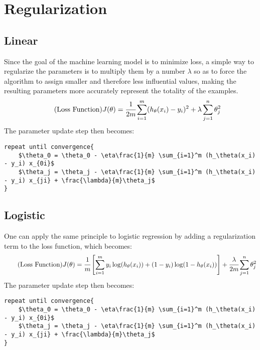 \section{Regularization}

\subsection{Linear}
Since the goal of the machine learning model is to minimize loss, a simple way to regularize the parameters is to multiply them by a number $\lambda$ so as to force the algorithm to assign smaller and therefore less influential values, making the resulting parameters more accurately represent the totality of the examples.
\begin{equation} \tag{Loss Function}
    J(\theta) = \cfrac{1}{2m} \sum_{i=1}^m (h_\theta(x_i) - y_i)^2 + \lambda \sum_{j=1}^n \theta_j^2
\end{equation}
The parameter update step then becomes:
\begin{lstlisting}[mathescape=true]
repeat until convergence{
    $\theta_0 = \theta_0 - \eta\frac{1}{m} \sum_{i=1}^m (h_\theta(x_i) - y_i) x_{0i}$
    $\theta_j = \theta_j - \eta\frac{1}{m} \sum_{i=1}^m (h_\theta(x_i) - y_i) x_{ji} + \frac{\lambda}{m}\theta_j$
}
\end{lstlisting}

\subsection{Logistic}
One can apply the same principle to logistic regression by adding a regularization term to the loss function, which becomes:
\begin{equation} \tag{Loss Function}
    J(\theta) = \cfrac{1}{m} \left[ \sum_{i=1}^m y_i \log(h_\theta(x_i)) + (1-y_i) \log(1-h_\theta(x_i)) \right] + \cfrac{\lambda}{2m} \sum_{j=1}^n \theta_j^2
\end{equation}
The parameter update step then becomes:
\begin{lstlisting}[mathescape=true]
repeat until convergence{
    $\theta_0 = \theta_0 - \eta\frac{1}{m} \sum_{i=1}^m (h_\theta(x_i) - y_i) x_{0i}$
    $\theta_j = \theta_j - \eta\frac{1}{m} \sum_{i=1}^m (h_\theta(x_i) - y_i) x_{ji} + \frac{\lambda}{m}\theta_j$
}
\end{lstlisting}

\newpage